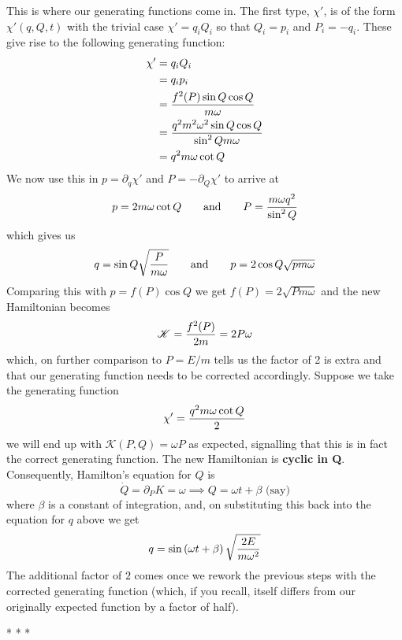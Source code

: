 \documentclass[english,seminar,headertitle]{lecture}
\begin{document}
This is where our generating functions come in. The first type, $\chi'$, is of the form $\chi'(q,Q,t)$ with the trivial case $\chi' = q_iQ_i$ so that $Q_i = p_i$ and $P_i = -q_i$. These give rise to the following generating function:
\begin{align*}
	\chi' &= q_iQ_i \\
		  &= q_ip_i \\
		  &= {f^2(P)\sin Q \cos Q\over m\omega } \\
		  &= {q^2 m^2 \omega^2 \sin Q \cos Q \over \sin^2 Q m\omega } \\
		  &= q^2 m \omega \cot Q
\end{align*}%
We now use this in $p = \partial_q \chi'$ and $P = -\partial_Q \chi'$ to arrive at
$$
p = 2m\omega\cot Q \qquad\textrm{and}\qquad P = {m\omega q^2 \over \sin^2 Q}
$$
which gives us
$$
q = \sin Q \sqrt{P \over m\omega} \qquad\textrm{and}\qquad p = 2\cos Q \sqrt{pm\omega}
$$
Comparing this with $p = f(P) \cos Q$ we get $f(P) = 2\sqrt{Pm\omega}$ and the new Hamiltonian becomes
$$
\mathscr{K} = {f^2(P) \over 2m} = 2P\omega
$$
which, on further comparison to $P = E/m$ tells us the factor of 2 is extra and that our generating function needs to be corrected accordingly. Suppose we take the generating function
$$
\chi' = {q^2m\omega \cot Q \over 2 }
$$
we will end up with $\mathscr{K}(P,Q) = \omega P$ as expected, signalling that this is in fact the correct generating function. The new Hamiltonian is \textbf{cyclic in Q}. Consequently, Hamilton's equation for $Q$ is
$$
\dot{Q} = \partial_P K = \omega \implies Q = \omega t + \beta \textrm{ (say)}
$$
where $\beta$ is a constant of integration, and, on substituting this back into the equation for $q$ above we get
$$
q = \sin \left( \omega t + \beta \right) \sqrt{2E \over m\omega^2}
$$
The additional factor of $2$ comes once we rework the previous steps with the corrected generating function (which, if you recall, itself differs from our originally expected function by a factor of half).

\vspace*{1.5cm}
{\centering
* \; * \; *

}
\end{document}
